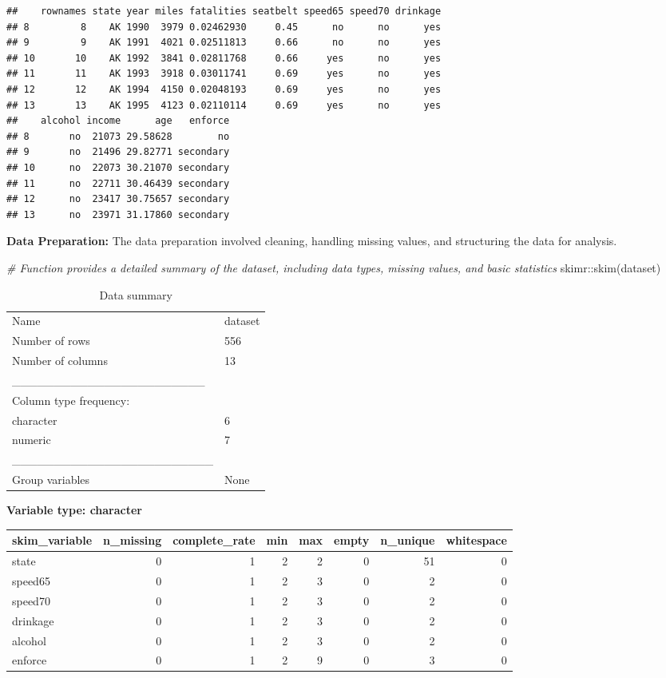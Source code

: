 \documentclass[
]{article}
\newenvironment{Shaded}{\begin{snugshade}}{\end{snugshade}}
\newcommand{\CommentTok}[1]{\textcolor[rgb]{0.56,0.35,0.01}{\textit{#1}}}
\newcommand{\FunctionTok}[1]{\textcolor[rgb]{0.00,0.00,0.00}{#1}}
\newcommand{\NormalTok}[1]{#1}
\newcommand{\SpecialCharTok}[1]{\textcolor[rgb]{0.00,0.00,0.00}{#1}}
\begin{document}
\begin{verbatim}
##    rownames state year miles fatalities seatbelt speed65 speed70 drinkage
## 8         8    AK 1990  3979 0.02462930     0.45      no      no      yes
## 9         9    AK 1991  4021 0.02511813     0.66      no      no      yes
## 10       10    AK 1992  3841 0.02811768     0.66     yes      no      yes
## 11       11    AK 1993  3918 0.03011741     0.69     yes      no      yes
## 12       12    AK 1994  4150 0.02048193     0.69     yes      no      yes
## 13       13    AK 1995  4123 0.02110114     0.69     yes      no      yes
##    alcohol income      age   enforce
## 8       no  21073 29.58628        no
## 9       no  21496 29.82771 secondary
## 10      no  22073 30.21070 secondary
## 11      no  22711 30.46439 secondary
## 12      no  23417 30.75657 secondary
## 13      no  23971 31.17860 secondary
\end{verbatim}

\textbf{Data Preparation:} The data preparation involved cleaning,
handling missing values, and structuring the data for analysis.

\begin{Shaded}
\begin{Highlighting}[]
\CommentTok{\# Function provides a detailed summary of the dataset, including data types, missing values, and basic statistics}
\NormalTok{skimr}\SpecialCharTok{::}\FunctionTok{skim}\NormalTok{(dataset)}
\end{Highlighting}
\end{Shaded}

\begin{longtable}[]{@{}ll@{}}
\caption{Data summary}\tabularnewline
\toprule
\endhead
Name & dataset \\
Number of rows & 556 \\
Number of columns & 13 \\
\_\_\_\_\_\_\_\_\_\_\_\_\_\_\_\_\_\_\_\_\_\_\_ & \\
Column type frequency: & \\
character & 6 \\
numeric & 7 \\
\_\_\_\_\_\_\_\_\_\_\_\_\_\_\_\_\_\_\_\_\_\_\_\_ & \\
Group variables & None \\
\bottomrule
\end{longtable}

\textbf{Variable type: character}

\begin{longtable}[]{@{}lrrrrrrr@{}}
\toprule
skim\_variable & n\_missing & complete\_rate & min & max & empty &
n\_unique & whitespace \\
\midrule
\endhead
state & 0 & 1 & 2 & 2 & 0 & 51 & 0 \\
speed65 & 0 & 1 & 2 & 3 & 0 & 2 & 0 \\
speed70 & 0 & 1 & 2 & 3 & 0 & 2 & 0 \\
drinkage & 0 & 1 & 2 & 3 & 0 & 2 & 0 \\
alcohol & 0 & 1 & 2 & 3 & 0 & 2 & 0 \\
enforce & 0 & 1 & 2 & 9 & 0 & 3 & 0 \\
\bottomrule
\end{longtable}
\end{document}
